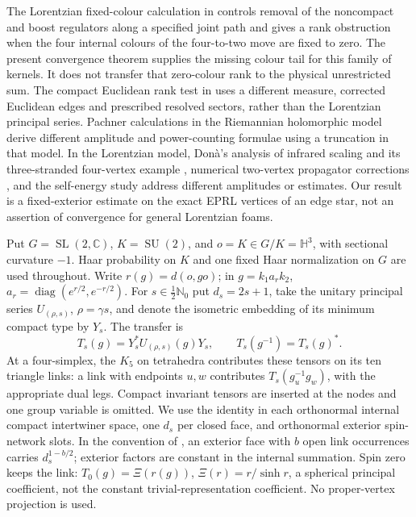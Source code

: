 \documentclass[11pt]{article}
\theoremstyle{remark}
\newcommand{\SU}{\operatorname{SU}(2)}
\newcommand{\SL}{\operatorname{SL}(2,\mathbb C)}
\newcommand{\Hh}{\mathbb H^3}
\begin{document}
The Lorentzian fixed-colour calculation in \cite{Archive69} controls removal of the noncompact and boost regulators along a specified joint path and gives a rank obstruction when the four internal colours of the four-to-two move are fixed to zero. The present convergence theorem supplies the missing colour tail for this family of kernels. It does not transfer that zero-colour rank to the physical unrestricted sum. The compact Euclidean rank test in \cite{Archive38} uses a different measure, corrected Euclidean edges and prescribed resolved sectors, rather than the Lorentzian principal series. Pachner calculations in the Riemannian holomorphic model \cite{Banburski,Chen} derive different amplitude and power-counting formulae using a truncation in that model. In the Lorentzian model, Don\`a's analysis of infrared scaling and its three-stranded four-vertex example \cite{Dona}, numerical two-vertex propagator corrections \cite{DonaFW}, and the self-energy study \cite{Riello} address different amplitudes or estimates. Our result is a fixed-exterior estimate on the exact EPRL vertices of an edge star, not an assertion of convergence for general Lorentzian foams.

Put \(G=\SL\), \(K=\SU\), and \(o=K\in G/K=\Hh\), with sectional curvature \(-1\). Haar probability on \(K\) and one fixed Haar normalization on \(G\) are used throughout. Write \(r(g)=d(o,go)\); in \(g=k_1a_rk_2\), \(a_r=\operatorname{diag}(e^{r/2},e^{-r/2})\). For \(s\in\tfrac12\mathbb N_0\) put \(d_s=2s+1\), take the unitary principal series \(U_{(\rho,s)}\), \(\rho=\gamma s\), and denote the isometric embedding of its minimum compact type by \(Y_s\). The transfer is
\[
 T_s(g)=Y_s^*U_{(\rho,s)}(g)Y_s,\qquad
 T_s(g^{-1})=T_s(g)^* .
\]
At a four-simplex, the \(K_5\) on tetrahedra contributes these tensors on its ten triangle links: a link with endpoints \(u,w\) contributes \(T_s(g_u^{-1}g_w)\), with the appropriate dual legs. Compact invariant tensors are inserted at the nodes and one group variable is omitted. We use the identity in each orthonormal internal compact intertwiner space, one \(d_s\) per closed face, and orthonormal exterior spin-network slots. In the convention of \cite{Archive69}, an exterior face with \(b\) open link occurrences carries \(d_s^{1-b/2}\); exterior factors are constant in the internal summation. Spin zero keeps the link: \(T_0(g)=\Xi(r(g))\), \(\Xi(r)=r/\sinh r\), a spherical principal coefficient, not the constant trivial-representation coefficient. No proper-vertex projection is used.
\end{document}
